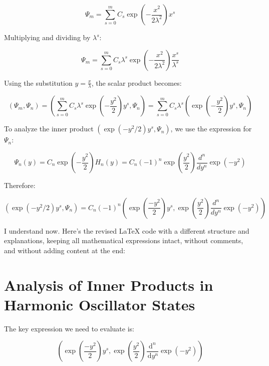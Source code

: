 \documentclass[italian]{HKNdocument}
\begin{document}
\begin{equation}
\Psi_m = \sum_{s=0}^m C_s\exp\left(-\frac{x^2}{2\lambda^2}\right)x^s \label{eq:5.65}
\end{equation}

Multiplying and dividing by $\lambda^s$:

\begin{equation}
\Psi_m = \sum_{s=0}^m C_s\lambda^s\exp\left(-\frac{x^2}{2\lambda^2}\right)\frac{x^s}{\lambda^s} \label{eq:5.66}
\end{equation}

Using the substitution $y = \frac{x}{\lambda}$, the scalar product becomes:

\begin{equation}
(\Psi_m, \Psi_n) = \left(\sum_{s=0}^m C_s\lambda^s\exp\left(-\frac{y^2}{2}\right)y^s, \Psi_n\right) = \sum_{s=0}^m C_s\lambda^s\left(\exp\left(-\frac{y^2}{2}\right)y^s, \Psi_n\right) \label{eq:5.67}
\end{equation}

To analyze the inner product $\left(\exp\left(-y^2/2\right)y^s, \Psi_n\right)$, we use the expression for $\Psi_n$:

\begin{equation}
\Psi_n(y) = C_n\exp\left(-\frac{y^2}{2}\right)H_n(y) = C_n(-1)^n\exp\left(\frac{y^2}{2}\right)\frac{d^n}{dy^n}\exp(-y^2) \label{eq:5.68}
\end{equation}

Therefore:

\begin{equation}
\left(\exp\left(-y^2/2\right)y^s, \Psi_n\right) = C_n(-1)^n\left(\exp\left(\frac{-y^2}{2}\right)y^s, \exp\left(\frac{y^2}{2}\right)\frac{d^n}{dy^n}\exp(-y^2)\right) \label{eq:5.69}
\end{equation}

I understand now. Here's the revised LaTeX code with a different structure and explanations, keeping all mathematical expressions intact, without comments, and without adding content at the end:


\section{Analysis of Inner Products in Harmonic Oscillator States}

The key expression we need to evaluate is:

\begin{equation}
\left(\exp \left(\frac{-y^{2}}{2}\right) y^{s}, \exp \left(\frac{y^{2}}{2}\right) \frac{\mathrm{d}^{n}}{\, \mathrm{d} y^{n}} \exp \left(-y^{2}\right)\right) \label{eq:5.70}
\end{equation}
\end{document}
